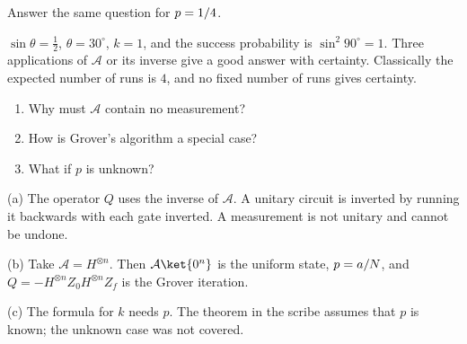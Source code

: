 \begin{exercisebox}
\begin{pproblem}[$p = 1/4$]\label{pp:amp4}
    Answer the same question for $p = 1/4$.
\end{pproblem}
\tcblower
\begin{wsolution}
    $\sin\theta = \frac{1}{2}$, $\theta = 30^\circ$, $k = 1$, and the success probability is
    $\sin^2 90^\circ = 1$. Three applications of $\mathcal{A}$ or its inverse give a good answer
    with certainty. Classically the expected number of runs is $4$, and no fixed number of runs
    gives certainty.
\end{wsolution}
\end{exercisebox}

\begin{exercisebox}
\begin{pproblem}\label{pp:ampshort}
    \leavevmode
    \begin{enumerate}[label=(\alph*)]
        \item Why must $\mathcal{A}$ contain no measurement?
        \item How is Grover's algorithm a special case?
        \item What if $p$ is unknown?
    \end{enumerate}
\end{pproblem}
\tcblower
\begin{wsolution}
    (a) The operator $Q$ uses the inverse of $\mathcal{A}$. A unitary circuit is inverted by running
    it backwards with each gate inverted. A measurement is not unitary and cannot be undone.

    (b) Take $\mathcal{A} = H^{\otimes n}$. Then $\mathcal{A}\ket{0^n}$ is the uniform state,
    $p = a/N$, and $Q = -H^{\otimes n} Z_0 H^{\otimes n} Z_f$ is the Grover iteration.

    (c) The formula for $k$ needs $p$. The theorem in the scribe assumes that $p$ is known; the
    unknown case was not covered.
\end{wsolution}
\end{exercisebox}
